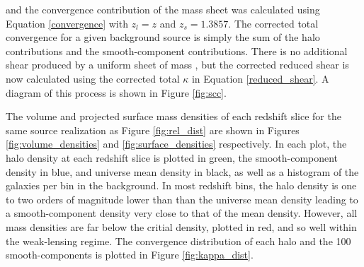 \documentclass[%
 reprint,
 amsmath,amssymb,
 aps,nofootinbib
]{revtex4-1}
\begin{document}
\noindent and the convergence contribution of the mass sheet was calculated using Equation \eqref{convergence} with ${z_l=z}$ and ${z_s=1.3857}$. The corrected total convergence for a given background source is simply the sum of the halo contributions and the smooth-component contributions. There is no additional shear produced by a uniform sheet of mass \cite{mass_degeneracy}, but the corrected reduced shear is now calculated using the corrected total $\kappa$ in Equation \eqref{reduced_shear}. A diagram of this process is shown in Figure \ref{fig:scc}.

The volume and projected surface mass densities of each redshift slice for the same source realization as Figure \ref{fig:rel_dist} are shown in Figures \ref{fig:volume_densities} and \ref{fig:surface_densities} respectively. In each plot, the halo density at each redshift slice is plotted in green, the smooth-component density in blue, and universe mean density in black, as well as a histogram of the galaxies per bin in the background. In most redshift bins, the halo density is one to two orders of magnitude lower than than the universe mean density leading to a smooth-component density very close to that of the mean density. However, all mass densities are far below the critial density, plotted in red, and so well within the weak-lensing regime. The convergence distribution of each halo and the 100 smooth-components is plotted in Figure \ref{fig:kappa_dist}.
\end{document}
